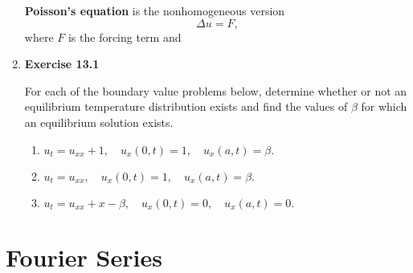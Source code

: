 \begin{enumerate}
\textbf{Poisson's equation} is the nonhomogeneous version
\[ \Delta u = F,\]
where $F$ is the forcing term and



\newpage

\item \textbf{Exercise 13.1}

For each of the boundary value problems below, determine whether or not an equilibrium temperature distribution exists and find the values of $\beta$ for which an equilibrium solution exists.
\begin{enumerate}
    \item $u_{t}=u_{xx} + 1, \quad u_{x}(0,t)=1, \quad u_{x}(a,t)=\beta.$
    \vspace{180pt}

    \item $u_{t}=u_{xx}, \quad u_{x}(0,t)=1, \quad u_{x}(a,t)=\beta.$
    \vspace{180pt}

    \item $u_{t}=u_{xx} + x - \beta , \quad u_{x}(0,t)=0, \quad u_{x}(a,t)=0.$
\end{enumerate}



\newpage 



\end{enumerate}



\section{Fourier Series}


